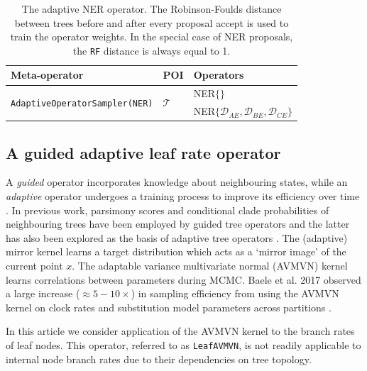 \documentclass[10pt,letterpaper]{article}
\begin{document}
\begin{table}[h!]
\centering
\begin{tabular}{|l l l|} 
 \hline
 Meta-operator & POI & Operators \\
\hline
 \multirow{2}{*}{\texttt{AdaptiveOperatorSampler(NER)}} & \multirow{2}{*}{$\mathcal{T}$} & NER$\{  \}$ \\ 
 && NER$\{ \mathcal{D}_{AE}, \mathcal{D}_{BE}, \mathcal{D}_{CE} \}$ \\
 \hline
\end{tabular}
\caption{The adaptive NER operator. 
The Robinson-Foulds distance between trees before and after every proposal accept is used to train the operator weights. In the special case of NER proposals, the \texttt{RF} distance is always equal to 1. }
\label{table:adaptiveNER}
\end{table}






\clearpage
\subsection*{A guided adaptive leaf rate operator}
\label{AVMVN_sect}

A \textit{guided} operator incorporates knowledge about neighbouring states, while an \textit{adaptive} operator undergoes a training process to improve its efficiency over time \cite{roberts2007coupling}. In previous work, parsimony scores and conditional clade probabilities of neighbouring trees have been employed by guided tree operators \cite{hohna2012guided,zhang2020using,meyer2019adaptive} and the latter has also been explored as the basis of  adaptive tree operators \cite{hohna2012guided,meyer2019adaptive}. The (adaptive) mirror kernel \cite{thawornwattana2018designing} learns a target distribution which acts as a `mirror image' of the current point $x$.  The adaptable variance multivariate normal (AVMVN) kernel \cite{baele2017adaptive,suchard2018bayesian} learns correlations between parameters during MCMC. Baele et al. 2017  observed a large increase ($\approx 5-10 \times$) in sampling efficiency from using the AVMVN kernel on clock rates and substitution model parameters across partitions \cite{baele2017adaptive}.  


In this article we consider application of the AVMVN kernel to the branch rates of leaf nodes. 
This operator, referred to as \texttt{LeafAVMVN}, is not readily applicable to internal node branch rates due to their dependencies on tree topology.  
\end{document}

